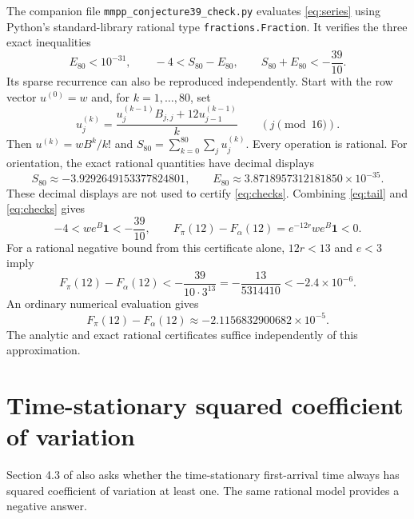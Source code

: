 \documentclass[11pt]{article}
\newcommand{\one}{\mathbf 1}
\begin{document}
The companion file \texttt{mmpp\_conjecture39\_check.py} evaluates
\eqref{eq:series} using Python's standard-library rational type
\texttt{fractions.Fraction}. It verifies the three exact inequalities
\begin{equation}\label{eq:checks}
 E_{80}<10^{-31},\qquad -4<S_{80}-E_{80},\qquad
 S_{80}+E_{80}<-\frac{39}{10}.
\end{equation}
Its sparse recurrence can also be reproduced independently. Start with
the row vector $u^{(0)}=w$ and, for $k=1,\ldots,80$, set
\[
 u^{(k)}_j=
 \frac{u^{(k-1)}_jB_{j,j}+12u^{(k-1)}_{j-1}}{k}
 \qquad(j\pmod{16}).
\]
Then $u^{(k)}=wB^k/k!$ and
$S_{80}=\sum_{k=0}^{80}\sum_j u^{(k)}_j$. Every operation is rational.
For orientation, the exact rational quantities have decimal displays
\[
 S_{80}\approx-3.9292649153377824801,
 \qquad E_{80}\approx3.8718957312181850\times10^{-35}.
\]
These decimal displays are not used to certify \eqref{eq:checks}.
Combining \eqref{eq:tail} and \eqref{eq:checks} gives
\[
 -4<we^B\one<-\frac{39}{10},\qquad
 F_\pi(12)-F_\alpha(12)=e^{-12r}we^B\one<0.
\]
For a rational negative bound from this certificate alone, $12r<13$
and $e<3$ imply
\[
 F_\pi(12)-F_\alpha(12)
 <-\frac{39}{10\cdot3^{13}}
 =-\frac{13}{5314410}<-2.4\times10^{-6}.
\]
An ordinary numerical evaluation gives
\[
 F_\pi(12)-F_\alpha(12)\approx-2.1156832900682\times10^{-5}.
\]
The analytic and exact rational certificates suffice independently of
this approximation.

\section{Time-stationary squared coefficient of variation}
Section 4.3 of \cite{He} also asks whether the time-stationary
first-arrival time always has squared coefficient of variation at least
one. The same rational model provides a negative answer.
\end{document}
